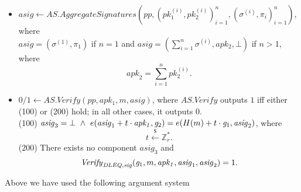\begin{construction}
\begin{itemize}
\item $\mathit{asig} \leftarrow \mathit{AS.AggregateSignatures}(\mathit{pp}, (\mathit{pk_1^{(i)}}, \mathit{pk_2^{(i)}})_{i=1}^{n}, (\sigma^{(i)}, \pi_i)_{i=1}^n)$, 
where \\ $\mathit{asig} = (\sigma^{(1)}, \pi_1)$  if $n=1$ and $\mathit{asig} = (\sum_{i=1}^{n} \sigma^{(i)}, \mathit{apk_2}, \bot)$ if $n>1$, where 
$$\mathit{apk}_2 = \sum_{i=1}^{n} \mathit{pk_2^{(i)}}.$$

\item $0/1 \leftarrow  \mathit{AS.Verify}(\mathit{pp}, \mathit{apk_1}, m, \mathit{asig})$, where $\mathit{AS.Verify}$ outputs $1$ iff either 
(100) or (200) hold; in all other cases, it outputs $0$. \\
 (100) $\mathit{asig}_3 = \bot \ \wedge \ e(\mathit{asig}_1 + t \cdot \mathit{apk_1}, \gtwoBLS) = e(H(m) + t \cdot \goneBLS, \mathit{asig}_2)$, 
where $$t \xleftarrow{\$} \mathbb{Z}_{r}^{*}.$$ 
(200) There exists no component $\mathit{asig}_3$ and $$\mathit{Verify}_{\mathit{DLEQ}, \mathit{sig}}(\mathit{g}_{1}, m, \mathit{apk_1}, \mathit{asig}_1, \mathit{asig}_2) = 1.$$ 

\end{itemize}
Above we have used the following argument system %
\begin{comment}
$$ \PSpk = (\Genpk, \Provpk, \Veripk) \ \ \ \ (1)$$ where 
\begin{itemize}
\item $(\GoneBLS, \goneBLS, \GtwoBLS, \gtwoBLS, \Hpk) \leftarrow \Genpk(\lambda)$ as a subprotocol of $\mathit{AS.Setup}(\lambda)$. 

\item $\pipk = (c,s) \leftarrow \Provpk(\goneBLS, \gtwoBLS, \mathit{pk_1}, \mathit{pk_2}, \mathit{sk})$ where \\ $k \xleftarrow{\$} \mathbb{Z}_{r}^{*}$, $A =k \cdot \goneBLS$, 
$B=k \cdot  \gtwoBLS$, $c = \Hpk (\goneBLS, \gtwoBLS, \mathit{pk_1}, \mathit{pk_2}, A, B)$, \\ $s = k - c \cdot \mathit{sk} \mod r$. 

\item $0/1 \leftarrow \Veripk(\goneBLS, \gtwoBLS, \mathit{pk_1}, \mathit{pk_2}, (c,s))$, 
where $\Veripk$ outputs 1 if  $c= \Hpk (\goneBLS, \gtwoBLS, \mathit{pk_1}, \mathit{pk_2}, A', B')$
where $A' = s \cdot \goneBLS + c \cdot \mathit{pk_1}$ and $B' = s \cdot \gtwoBLS  + c \cdot \mathit{pk_2}$ and it outputs $0$ otherwise.  
\end{itemize}


\end{comment}
\end{construction}
